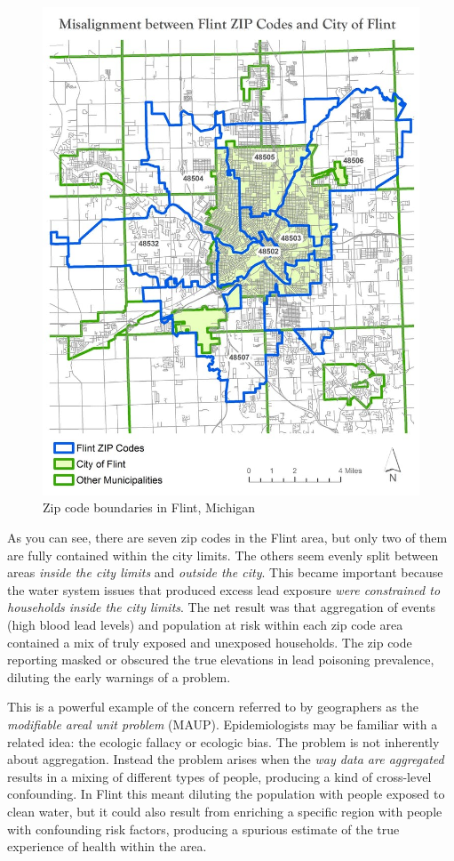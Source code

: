 \documentclass[
]{book}
\begin{document}
\begin{figure}
\centering
\includegraphics{images/flint-maup.jpg}
\caption{\label{fig:unnamed-chunk-3}Zip code boundaries in Flint, Michigan}
\end{figure}

As you can see, there are seven zip codes in the Flint area, but only two of them are fully contained within the city limits. The others seem evenly split between areas \emph{inside the city limits} and \emph{outside the city}. This became important because the water system issues that produced excess lead exposure \emph{were constrained to households inside the city limits}. The net result was that aggregation of events (high blood lead levels) and population at risk within each zip code area contained a mix of truly exposed and unexposed households. The zip code reporting masked or obscured the true elevations in lead poisoning prevalence, diluting the early warnings of a problem.

This is a powerful example of the concern referred to by geographers as the \emph{modifiable areal unit problem} (MAUP). Epidemiologists may be familiar with a related idea: the ecologic fallacy or ecologic bias. The problem is not inherently about aggregation. Instead the problem arises when the \emph{way data are aggregated} results in a mixing of different types of people, producing a kind of cross-level confounding. In Flint this meant diluting the population with people exposed to clean water, but it could also result from enriching a specific region with people with confounding risk factors, producing a spurious estimate of the true experience of health within the area.
\end{document}
